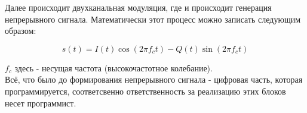 Далее происходит двухканальная модуляция, где и происходит генерация непрерывного сигнала. Математически этот процесс можно записать
следующим образом:

$$s(t) = I(t)\cos(2\pi f_c t) - Q(t)\sin(2\pi f_c t)$$

$f_c$ здесь - несущая частота (высокочастотное колебание). \\

Всё, что было до формирования непрерывного сигнала - цифровая часть, которая программируется, соответсвенно ответственность за
реализацию этих блоков несет программист.

\endinput